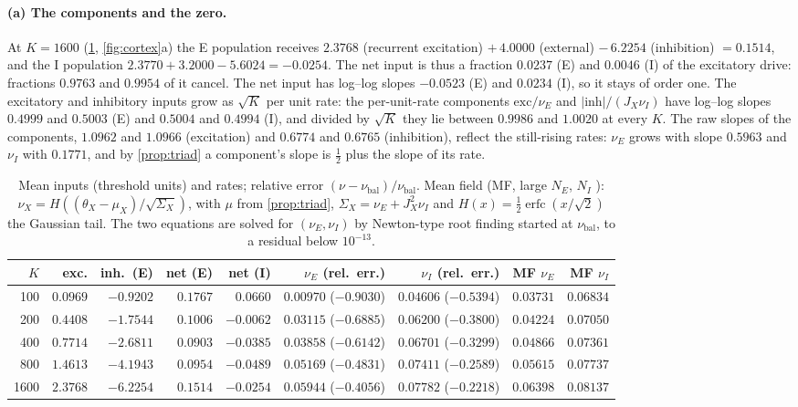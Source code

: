 \documentclass[11pt]{article}
\theoremstyle{definition}\newtheorem{definition}[theorem]{Definition}
\theoremstyle{remark}\newtheorem{remark}[theorem]{Remark}
\begin{document}
\paragraph{(a) The components and the zero.} At $K=1600$ (\cref{tab:net}, \cref{fig:cortex}a) the E population receives $2.3768$ (recurrent excitation) $+\,4.0000$ (external) $-\,6.2254$ (inhibition) $=0.1514$, and the I population $2.3770+3.2000-5.6024=-0.0254$. The net input is thus a fraction $0.0237$ (E) and $0.0046$ (I) of the excitatory drive: fractions $0.9763$ and $0.9954$ of it cancel. The net input has log--log slopes $-0.0523$ (E) and $0.0234$ (I), so it stays of order one. The excitatory and inhibitory inputs grow as $\sqrt K$ per unit rate: the per-unit-rate components $\text{exc}/\nu_E$ and $|\text{inh}|/(J_X\nu_I)$ have log--log slopes $0.4999$ and $0.5003$ (E) and $0.5004$ and $0.4994$ (I), and divided by $\sqrt K$ they lie between $0.9986$ and $1.0020$ at every $K$. The raw slopes of the components, $1.0962$ and $1.0966$ (excitation) and $0.6774$ and $0.6765$ (inhibition), reflect the still-rising rates: $\nu_E$ grows with slope $0.5963$ and $\nu_I$ with $0.1771$, and by \cref{prop:triad} a component's slope is $\frac12$ plus the slope of its rate.

\begin{table}[htbp]\centering\small\setlength{\tabcolsep}{4.5pt}
\caption{Mean inputs (threshold units) and rates; relative error $(\nu-\nu_{\mathrm{bal}})/\nu_{\mathrm{bal}}$. Mean field (MF, large $N_E$, $N_I$ \cite{vVS98}): $\nu_X=H((\theta_X-\mu_X)/\sqrt{\Sigma_X})$, with $\mu$ from \cref{prop:triad}, $\Sigma_X=\nu_E+J_X^2\nu_I$ and $H(x)=\frac12\operatorname{erfc}(x/\sqrt2)$ the Gaussian tail. The two equations are solved for $(\nu_E,\nu_I)$ by Newton-type root finding started at $\nu_{\mathrm{bal}}$, to a residual below $10^{-13}$.}\label{tab:net}
\begin{tabular}{@{}rrrrrrrrr@{}}\toprule
$K$ & exc. & inh.\ (E) & net (E) & net (I) & $\nu_E$ (rel.\ err.) & $\nu_I$ (rel.\ err.) & MF $\nu_E$ & MF $\nu_I$\\\midrule
100 & $0.0969$ & $-0.9202$ & $0.1767$ & $0.0660$ & $0.00970$ ($-0.9030$) & $0.04606$ ($-0.5394$) & $0.03731$ & $0.06834$\\
200 & $0.4408$ & $-1.7544$ & $0.1006$ & $-0.0062$ & $0.03115$ ($-0.6885$) & $0.06200$ ($-0.3800$) & $0.04224$ & $0.07050$\\
400 & $0.7714$ & $-2.6811$ & $0.0903$ & $-0.0385$ & $0.03858$ ($-0.6142$) & $0.06701$ ($-0.3299$) & $0.04866$ & $0.07361$\\
800 & $1.4613$ & $-4.1943$ & $0.0954$ & $-0.0489$ & $0.05169$ ($-0.4831$) & $0.07411$ ($-0.2589$) & $0.05615$ & $0.07737$\\
1600 & $2.3768$ & $-6.2254$ & $0.1514$ & $-0.0254$ & $0.05944$ ($-0.4056$) & $0.07782$ ($-0.2218$) & $0.06398$ & $0.08137$\\\bottomrule
\end{tabular}
\end{table}
\end{document}
